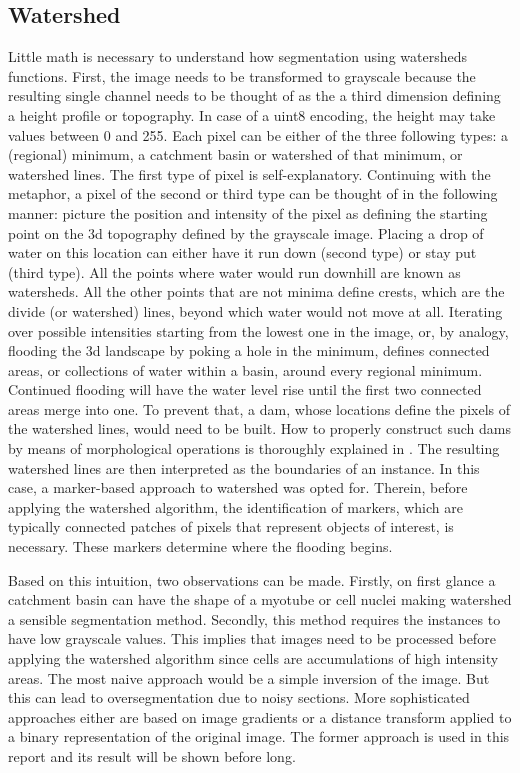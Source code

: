 \subsection{Watershed}
Little math is necessary to understand how segmentation using watersheds functions. First, the image needs to be transformed to grayscale because the resulting single channel needs to be thought of as the a third dimension defining a height profile or topography. In case of a uint8 encoding, the height may take values between 0 and 255. Each pixel can be either of the three following types: a (regional) minimum, a catchment basin or watershed of that minimum, or watershed lines. The first type of pixel is self-explanatory. Continuing with the metaphor, a pixel of the second or third type can be thought of in the following manner: picture the position and intensity of the pixel as defining the starting point on the 3d topography defined by the grayscale image. Placing a drop of water on this location can either have it run down (second type) or stay put (third type). All the points where water would run downhill are known as watersheds. All the other points that are not minima define crests, which are the divide (or watershed) lines, beyond which water would not move at all. Iterating over possible intensities starting from the lowest one in the image, or, by analogy, flooding the 3d landscape by poking a hole in the minimum, defines connected areas, or collections of water within a basin, around every regional minimum. Continued flooding will have the water level rise until the first two connected areas merge into one. To prevent that, a dam, whose locations define the pixels of the watershed lines, would need to be built. How to properly construct such dams by means of morphological operations \cite{serra} is thoroughly explained in \cite{Gonzalez1992, coupriewatershed}. The resulting watershed lines are then interpreted as the boundaries of an instance. In this case, a marker-based approach to watershed \cite{meyer} was opted for. Therein, before applying the watershed algorithm, the identification of markers, which are typically connected patches of pixels that represent objects of interest, is necessary. These markers determine where the flooding begins. 

Based on this intuition, two observations can be made. Firstly, on first glance a catchment basin can have the shape of a myotube or cell nuclei making watershed a sensible segmentation method. Secondly, this method requires the instances to have low grayscale values. This implies that images need to be processed before applying the watershed algorithm since cells are accumulations of high intensity areas. The most naive approach would be a simple inversion of the image. But this can lead to oversegmentation due to noisy sections. More sophisticated approaches either are based on image gradients or a distance transform applied to a binary representation of the original image. The former approach is used in this report and its result will be shown before long.

